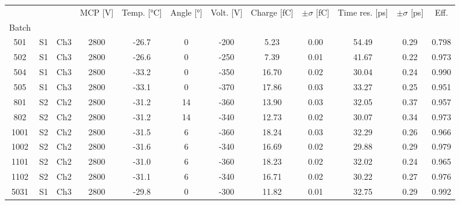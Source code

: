 \begin{tabular}{cccccccccccc}
\toprule
 &  &  & MCP [V] & Temp. [°C] & Angle [°] & Volt. [V] & Charge [fC] & \(\pm\sigma\) [fC] & Time res. [ps] & \(\pm\sigma\) [ps] & Eff. \\
Batch &  &  &  &  &  &  &  &  &  &  &  \\
\midrule
501 & S1 & Ch3 & 2800 & -26.7 & 0 & -200 & 5.23 & 0.00 & 54.49 & 0.29 & 0.798 \\
502 & S1 & Ch3 & 2800 & -26.6 & 0 & -250 & 7.39 & 0.01 & 41.67 & 0.22 & 0.973 \\
504 & S1 & Ch3 & 2800 & -33.2 & 0 & -350 & 16.70 & 0.02 & 30.04 & 0.24 & 0.990 \\
505 & S1 & Ch3 & 2800 & -33.1 & 0 & -370 & 17.86 & 0.03 & 33.27 & 0.25 & 0.951 \\
801 & S2 & Ch2 & 2800 & -31.2 & 14 & -360 & 13.90 & 0.03 & 32.05 & 0.37 & 0.957 \\
802 & S2 & Ch2 & 2800 & -31.2 & 14 & -340 & 12.73 & 0.02 & 30.07 & 0.34 & 0.973 \\
1001 & S2 & Ch2 & 2800 & -31.5 & 6 & -360 & 18.24 & 0.03 & 32.29 & 0.26 & 0.966 \\
1002 & S2 & Ch2 & 2800 & -31.6 & 6 & -340 & 16.69 & 0.02 & 29.88 & 0.29 & 0.979 \\
1101 & S2 & Ch2 & 2800 & -31.0 & 6 & -360 & 18.23 & 0.02 & 32.02 & 0.24 & 0.965 \\
1102 & S2 & Ch2 & 2800 & -31.1 & 6 & -340 & 16.71 & 0.02 & 30.22 & 0.27 & 0.976 \\
5031 & S1 & Ch3 & 2800 & -29.8 & 0 & -300 & 11.82 & 0.01 & 32.75 & 0.29 & 0.992 \\
\bottomrule
\end{tabular}
